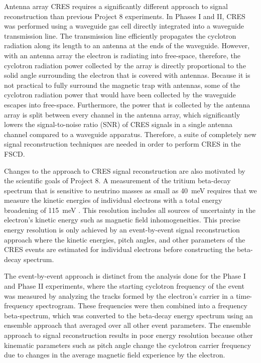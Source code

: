 Antenna array CRES requires a significantly different approach to signal reconstruction than previous Project 8 experiments. In Phases I and II, CRES was performed using a waveguide gas cell directly integrated into a waveguide transmission line. The transmission line efficiently propagates the cyclotron radiation along its length to an antenna at the ends of the waveguide. However, with an antenna array the electron is radiating into free-space, therefore, the cyclotron radiation power collected by the array is directly proportional to the solid angle surrounding the electron that is covered with antennas. Because it is not practical to fully surround the magnetic trap with antennas, some of the cyclotron radiation power that would have been collected by the waveguide escapes into free-space. Furthermore, the power that is collected by the antenna array is split between every channel in the antenna array, which significantly lowers the signal-to-noise ratio (SNR) of CRES signals in a single antenna channel compared to a waveguide apparatus. Therefore, a suite of completely new signal reconstruction techniques are needed in order to perform CRES in the FSCD.

Changes to the approach to CRES signal reconstruction are also motivated by the scientific goals of Project 8. A measurement of the tritium beta-decay spectrum that is sensitive to neutrino masses as small as 40~meV requires that we measure the kinetic energies of individual electrons with a total energy broadening of 115~meV \cite{p8bayesian}. This resolution includes all sources of uncertainty in the electron's kinetic energy such as magnetic field inhomogeneities. This precise energy resolution is only achieved by an event-by-event signal reconstruction approach where the kinetic energies, pitch angles, and other parameters of the CRES events are estimated for individual electrons before constructing the beta-decay spectrum. 

The event-by-event approach is distinct from the analysis done for the Phase I and Phase II experiments, where the starting cyclotron frequency of the event was measured by analyzing the tracks formed by the electron's carrier in a time-frequency spectrogram. These frequencies were then combined into a frequency beta-spectrum, which was converted to the beta-decay energy spectrum using an ensemble approach that averaged over all other event parameters. The ensemble approach to signal reconstruction results in poor energy resolution because other kinematic parameters such as pitch angle change the cyclotron carrier frequency due to changes in the average magnetic field experience by the electron.

